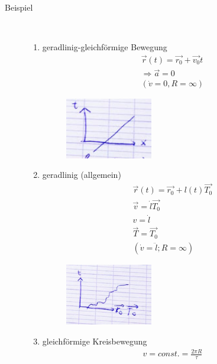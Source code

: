 \begin{description}
\item[Beispiel]~\par
\begin{enumerate}
\item geradlinig-gleichförmige Bewegung 
\begin{align*}
\vec{r}(t)=\vec{r_0}+\vec{v_0}t\\
\Rightarrow\vec{a}=0\\
(\dot{v}=0, R=\infty)
\end{align*}
\begin{figure}[h]
\begin{center}
\includegraphics[width=0.4\textwidth]{Skizzen/Anhang8Kopie.jpg}
\end{center}
\caption{}
\end{figure}
\item geradlinig (allgemein)
\begin{align*}
\vec{r}(t)=\vec{r_0}+l(t)\vec{T_0}\\
\vec{v}=\dot{l}\vec{T_0} \\
v=\dot{l} \\
\vec{T}=\vec{T_0} \\
(\dot{v}=\ddot{l}; R=\infty)
\end{align*}
\begin{figure}[h]
\begin{center}
\includegraphics[width=0.4\textwidth]{Skizzen/Anhang8.jpg}
\end{center}
\caption{}
\end{figure}
\item gleichförmige Kreisbewegung
\begin{align*}
v=const.=\frac{2\pi R}{\tau}\\

\end{align*}
\end{enumerate}
\end{description}
